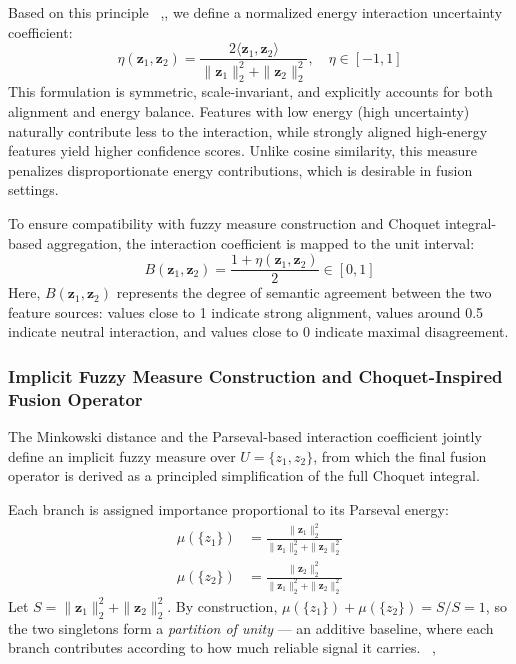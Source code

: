 \documentclass[12pt]{article}
\begin{document}
Based on this principle ~\cite{b12},\cite{b13}, we define a normalized energy interaction uncertainty coefficient:
\begin{equation*}
    \eta(\mathbf{z}_1, \mathbf{z}_2) = \frac{2\langle \mathbf{z}_1, \mathbf{z}_2 \rangle}{\|\mathbf{z}_1\|_2^2 + \|\mathbf{z}_2\|_2^2}, \quad \eta \in [-1, 1]
    \label{eq:eta}
\end{equation*}
This formulation is symmetric, scale-invariant, and explicitly accounts for both alignment and energy balance. Features with low energy (high uncertainty) naturally contribute less to the interaction, while strongly aligned high-energy features yield higher confidence scores. Unlike cosine similarity, this measure penalizes disproportionate energy contributions, which is desirable in fusion settings.

To ensure compatibility with fuzzy measure construction and Choquet integral-based aggregation, the interaction coefficient is mapped to the unit interval:
\begin{equation*}
    B(\mathbf{z}_1, \mathbf{z}_2) = \frac{1 + \eta(\mathbf{z}_1, \mathbf{z}_2)}{2} \in [0, 1]
    \label{eq:alignment}
\end{equation*}
Here, $B(\mathbf{z}_1, \mathbf{z}_2)$ represents the degree of semantic agreement between the two feature sources: values close to 1 indicate strong alignment, values around 0.5 indicate neutral interaction, and values close to 0 indicate maximal disagreement.

\subsubsection{Implicit Fuzzy Measure Construction and Choquet-Inspired Fusion Operator}

The Minkowski distance and the Parseval-based interaction coefficient jointly define an implicit fuzzy measure over $U = \{z_1, z_2\}$, from which the final fusion operator is derived as a principled simplification of the full Choquet integral.

Each branch is assigned importance proportional to its Parseval energy:
\begin{align*}
    \mu(\{z_1\}) &= \frac{\|\mathbf{z}_1\|_2^2}{\|\mathbf{z}_1\|_2^2 + \|\mathbf{z}_2\|_2^2} \\[6pt]
    \mu(\{z_2\}) &= \frac{\|\mathbf{z}_2\|_2^2}{\|\mathbf{z}_1\|_2^2 + \|\mathbf{z}_2\|_2^2}
\end{align*}
Let $S = \|\mathbf{z}_1\|_2^2 + \|\mathbf{z}_2\|_2^2$. By construction, $\mu(\{z_1\}) + \mu(\{z_2\}) = S/S = 1$, so the two singletons form a \emph{partition of unity} — an additive baseline, where each branch contributes according to how much reliable signal it carries. ~\cite{b15},~\cite{b14}
\end{document}
